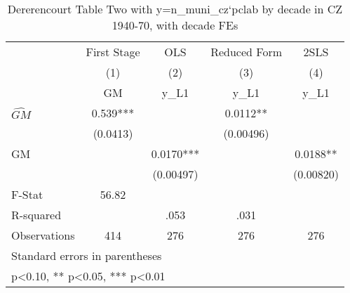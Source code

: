 \begin{table}[htbp]\centering
\def\sym#1{\ifmmode^{#1}\else\(^{#1}\)\fi}
\caption{Dererencourt Table Two with y=n\_muni\_cz`pclab by decade in CZ 1940-70, with decade FEs}
\begin{tabular}{l*{4}{c}}
\toprule
                    & First Stage   &         OLS   &Reduced Form   &        2SLS   \\
                    &\multicolumn{1}{c}{(1)}&\multicolumn{1}{c}{(2)}&\multicolumn{1}{c}{(3)}&\multicolumn{1}{c}{(4)}\\
                    &\multicolumn{1}{c}{GM}&\multicolumn{1}{c}{y\_L1}&\multicolumn{1}{c}{y\_L1}&\multicolumn{1}{c}{y\_L1}\\
\midrule
$\hat{GM}$          &       0.539***&               &      0.0112** &               \\
                    &    (0.0413)   &               &   (0.00496)   &               \\
\addlinespace
GM                  &               &      0.0170***&               &      0.0188** \\
                    &               &   (0.00497)   &               &   (0.00820)   \\
\midrule
F-Stat              &       56.82   &               &               &               \\
R-squared           &               &        .053   &        .031   &               \\
Observations        &         414   &         276   &         276   &         276   \\
\bottomrule
\multicolumn{5}{l}{\footnotesize Standard errors in parentheses}\\
\multicolumn{5}{l}{\footnotesize * p<0.10, ** p<0.05, *** p<0.01}\\
\end{tabular}
\end{table}
